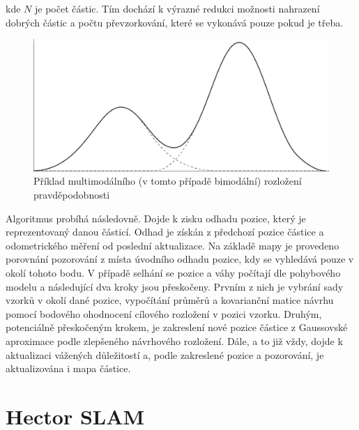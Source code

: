 \documentclass[12pt]{report}
\begin{document}
kde $N$ je počet částic. Tím dochází k výrazné redukci možnosti nahrazení dobrých částic a počtu převzorkování, které se vykonává pouze pokud je třeba.\\
\begin{figure}[!ht]
	\begin{center}
		\includegraphics[width=0.7\columnwidth]{imgs/multimodal.png}
	\end{center}
	\caption{Příklad multimodálního (v tomto případě bimodální) rozložení pravděpodobnosti}
	\label{fig:multimodal}
\end{figure}
\indent Algoritmus probíhá následovně. Dojde k zisku odhadu pozice, který je reprezentovaný danou částicí. Odhad je získán z předchozí pozice částice a odometrického měření od poslední aktualizace. Na základě mapy je provedeno porovnání pozorování z místa úvodního odhadu pozice, kdy se vyhledává pouze v okolí tohoto bodu. V případě selhání se pozice a váhy počítají dle pohybového modelu a následující dva kroky jsou přeskočeny. Prvním z nich je vybrání sady vzorků v okolí dané pozice, vypočítání průměrů a kovarianční matice návrhu pomocí bodového ohodnocení cílového rozložení v pozici vzorku. Druhým, potenciálně přeskočeným krokem, je zakreslení nové pozice částice z Gaussovské aproximace podle zlepšeného návrhového rozložení. Dále, a to již vždy, dojde k aktualizaci vážených důležitostí a, podle zakreslené pozice a pozorování, je aktualizována i mapa částice. 
 
\newpage

\section{Hector SLAM}
\end{document}

